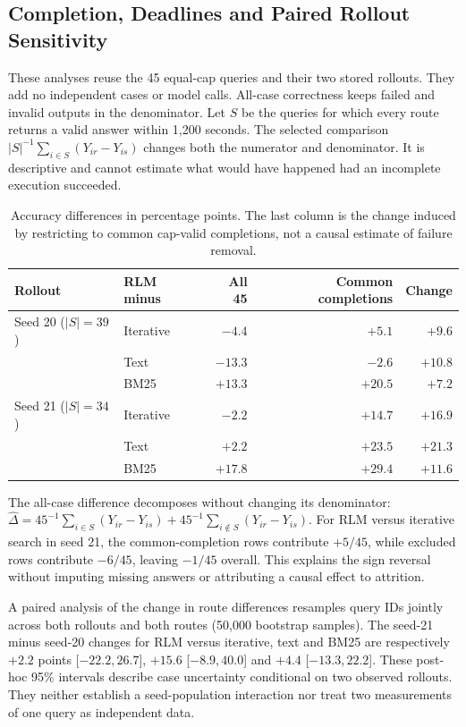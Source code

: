 \subsection{Completion, Deadlines and Paired Rollout Sensitivity}
\label{app:completion-sensitivity}

These analyses reuse the 45 equal-cap queries and their two stored rollouts. They add no independent cases or model calls. All-case correctness keeps failed and invalid outputs in the denominator. Let $S$ be the queries for which every route returns a valid answer within 1,200 seconds. The selected comparison $|S|^{-1}\sum_{i\in S}(Y_{ir}-Y_{is})$ changes both the numerator and denominator. It is descriptive and cannot estimate what would have happened had an incomplete execution succeeded.

\begin{table}[htbp]
\centering
\small
\begin{tabular}{@{}llrrr@{}}
\toprule
Rollout & RLM minus & All 45 & Common completions & Change \\
\midrule
Seed 20 ($|S|=39$) & Iterative & $-4.4$ & $+5.1$ & $+9.6$ \\
 & Text & $-13.3$ & $-2.6$ & $+10.8$ \\
 & BM25 & $+13.3$ & $+20.5$ & $+7.2$ \\
Seed 21 ($|S|=34$) & Iterative & $-2.2$ & $+14.7$ & $+16.9$ \\
 & Text & $+2.2$ & $+23.5$ & $+21.3$ \\
 & BM25 & $+17.8$ & $+29.4$ & $+11.6$ \\
\bottomrule
\end{tabular}
\caption{Accuracy differences in percentage points. The last column is the change induced by restricting to common cap-valid completions, not a causal estimate of failure removal.}
\label{tab:selection-sensitivity}
\end{table}

The all-case difference decomposes without changing its denominator: $\widehat\Delta=45^{-1}\sum_{i\in S}(Y_{ir}-Y_{is})+45^{-1}\sum_{i\notin S}(Y_{ir}-Y_{is})$. For RLM versus iterative search in seed 21, the common-completion rows contribute $+5/45$, while excluded rows contribute $-6/45$, leaving $-1/45$ overall. This explains the sign reversal without imputing missing answers or attributing a causal effect to attrition.

A paired analysis of the change in route differences resamples query IDs jointly across both rollouts and both routes (50,000 bootstrap samples). The seed-21 minus seed-20 changes for RLM versus iterative, text and BM25 are respectively $+2.2$ points [$-22.2,26.7$], $+15.6$ [$-8.9,40.0$] and $+4.4$ [$-13.3,22.2$]. These post-hoc 95\% intervals describe case uncertainty conditional on two observed rollouts. They neither establish a seed-population interaction nor treat two measurements of one query as independent data.

